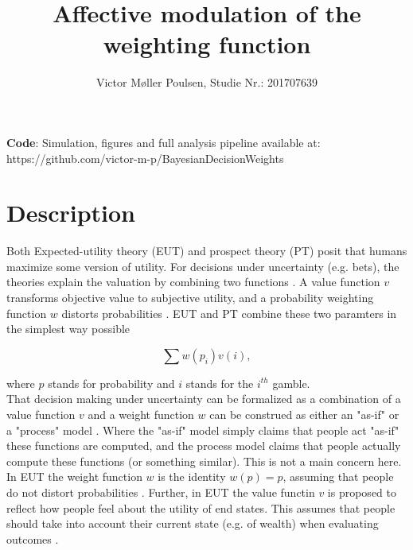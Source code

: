 \documentclass[12pt]{article}
\title{Affective modulation of the weighting function}
\author{Victor Møller Poulsen, Studie Nr.: 201707639}
\begin{document}
\maketitle
\leavevmode

\textbf{Code}: Simulation, figures and
full analysis pipeline available at: \\
https://github.com/victor-m-p/BayesianDecisionWeights


\section{Description}

Both Expected-utility theory (EUT) and prospect theory
(PT) posit that humans maximize some version of
utility. For decisions under uncertainty
(e.g. bets), the theories explain the valuation
by combining two functions
\autocite{rottenstreich2001money}.
A value function $v$ transforms objective value to
subjective utility, and a probability
weighting function $w$
distorts probabilities \autocite{rottenstreich2001money,
gonzalez1999shape}.
EUT and PT combine these
two paramters in
the simplest way possible
\autocite{rottenstreich2001money}

\[
	\sum w(p_i)v(i),
\]

where $p$ stands for probability and $i$ stands for the
$i^{th}$ gamble. \\

That decision making under uncertainty can
be formalized as a combination of a value
function $v$ and a weight function  $w$
can be construed
as either an "as-if" or a "process" model
\autocite{newell2015straight}. Where the
"as-if" model simply claims that people act
"as-if" these functions are computed, and the
process model claims that people actually compute
these functions (or something similar). This
is not a main concern here. \\

In EUT the weight function $w$
is the identity $w(p) = p$, assuming that people do
not distort probabilities \autocite{rottenstreich2001money}.
Further, in EUT the value functin $v$ is
proposed to reflect how people feel about
the utility of end states. This assumes that people should
take into account their current state (e.g. of wealth)
when evaluating outcomes
\autocite{newell2015straight}.

\vspace{3mm}
\end{document}
